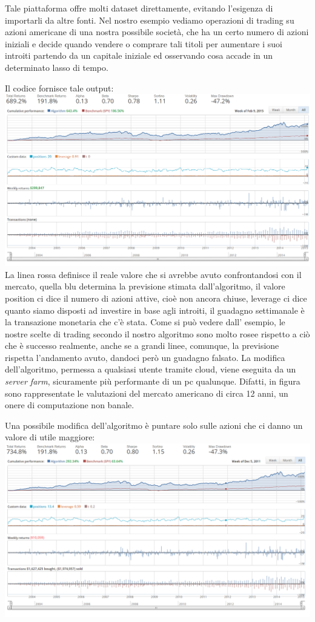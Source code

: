 			\par 
			Tale piattaforma offre molti dataset direttamente, evitando l'esigenza di importarli da altre fonti. Nel nostro esempio vediamo operazioni di trading su azioni americane di una nostra possibile società, che ha un certo numero di azioni iniziali e decide quando vendere o comprare tali titoli per aumentare i suoi introiti partendo da un capitale iniziale ed osservando cosa accade in un determinato lasso di tempo.
			\par 
			Il codice fornisce tale output:
			\includegraphics[width=1.0\textwidth, height=0.40\textheight]{inizio.png} 
			La linea rossa definisce il reale valore che si avrebbe avuto confrontandosi con il mercato, quella blu determina la previsione stimata dall'algoritmo, il valore position ci dice il numero di azioni attive, cioè non ancora chiuse, leverage ci dice quanto siamo disposti ad investire in base agli introiti, il guadagno settimanale è la transazione monetaria che c'è stata.
			Come si può vedere dall' esempio, le nostre scelte di trading secondo il nostro algoritmo sono molto rosee rispetto a ciò che è successo realmente, anche se a grandi linee, comunque, la previsione rispetta l'andamento avuto, dandoci però un guadagno falsato.
			La modifica dell'algoritmo, permessa a qualsiasi utente tramite cloud, viene eseguita da un \emph{server farm}, sicuramente più performante di un pc qualunque. Difatti, in figura sono rappresentate le valutazioni del mercato americano di circa 12 anni, un onere di computazione non banale. \par
			Una possibile modifica dell'algoritmo è puntare solo sulle azioni che ci danno un valore di utile maggiore:
			\includegraphics[width=1.0\textwidth, height=0.40\textheight]{factorfilter0,1.png} 
